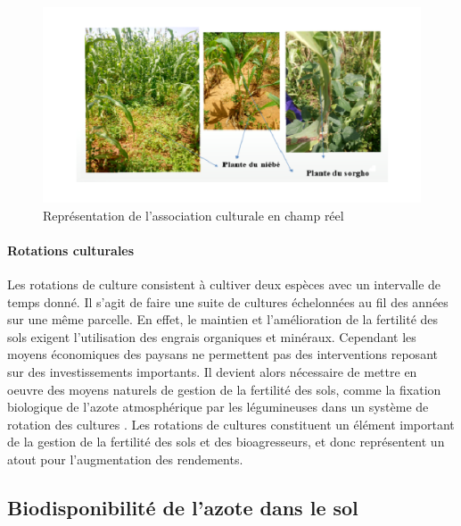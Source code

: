 \documentclass[a4paper,11pt]{article}
\begin{document}
\begin{figure}%
  \begin{center}
    \includegraphics[width=16cm]{images/AssociationChampReel}
  \end{center}
  \caption{Représentation de l'association culturale en champ réel}
\end{figure}

\paragraph{Rotations culturales}

Les rotations de culture consistent à cultiver deux espèces avec un
intervalle de temps donné. Il s'agit de faire une suite de cultures
échelonnées au fil des années sur une même parcelle. En effet, le
maintien et l'amélioration de la fertilité des sols exigent
l'utilisation des engrais organiques et minéraux. Cependant les moyens
économiques des paysans ne permettent pas des interventions reposant
sur des investissements importants. Il devient alors nécessaire de
mettre en oeuvre des moyens naturels de gestion de la fertilité des
sols, comme la fixation biologique de l'azote atmosphérique par les
légumineuses dans un système de rotation des cultures
\cite{TRAORE_2009}. Les rotations de cultures constituent un élément
important de la gestion de la fertilité des sols et des bioagresseurs,
et donc représentent un atout pour l'augmentation des rendements.



\subsection{Biodisponibilité de l'azote dans le sol}
\end{document}

